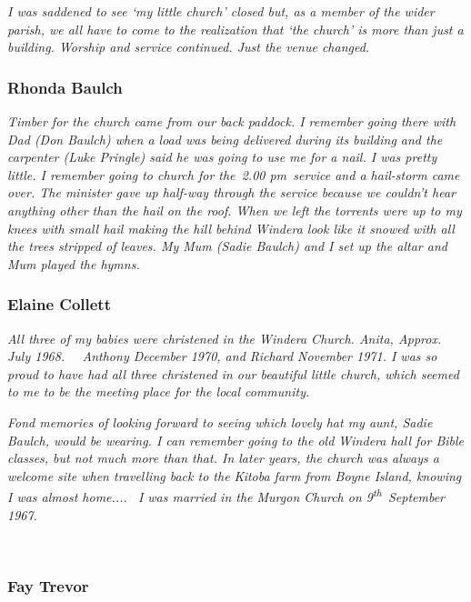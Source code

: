 \emph{I was saddened to see `my little church' closed but, as a member of the wider parish, we all have to come to the realization that `the church' is more than just a building. Worship and service continued. Just the venue changed.}



\subsubsection{Rhonda Baulch}



\emph{Timber for the church came from our back paddock. I remember going there with Dad (Don Baulch) when a load was being delivered during its building and the carpenter (Luke Pringle) said he was going to use me for a nail. I was pretty little. I remember going to church for the~2.00 pm~service and a hail-storm came over. The minister gave up half-way through the service because we couldn't hear anything other than the hail on the roof. When we left the torrents were up to my knees with small hail making the hill behind Windera look like it snowed with all the trees stripped of leaves. My Mum (Sadie Baulch) and I set up the altar and Mum played the hymns.}



\subsubsection{Elaine Collett}



\emph{All three of my babies were christened in the Windera Church. Anita, Approx. July 1968.~~ Anthony December 1970, and Richard November 1971. I was so proud to have had all three christened in our beautiful little church, which seemed to me to be the meeting place for the local community.}



\emph{Fond memories of looking forward to seeing which lovely hat my aunt, Sadie Baulch, would be wearing. I can remember going to the old Windera hall for Bible classes, but not much more than that. In later years, the church was always a welcome site when travelling back to the Kitoba farm from Boyne Island, knowing I was almost home.... ~I was married in the Murgon Church on 9\textsuperscript{th}~September 1967.}



~



\subsubsection{Fay Trevor}



